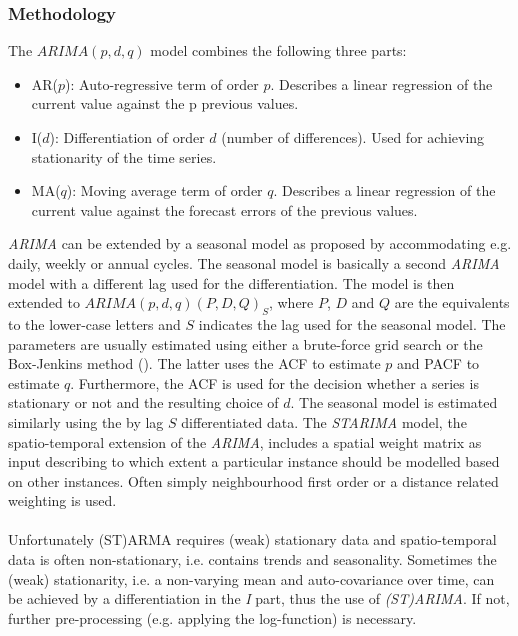 \documentclass[a4paper,reqno,]{article}
\begin{document}
\subsubsection{Methodology}
The $ARIMA(p,d,q)$ model combines the following three parts:
\begin{itemize}
\item AR($p$): Auto-regressive term of order $p$. Describes a linear regression of the current value against the p previous values.
\item I($d$): Differentiation of order $d$ (number of differences). Used for achieving stationarity of the time series.
\item MA($q$): Moving average term of order $q$. Describes a linear regression of the current value against the forecast errors of the previous values.
\end{itemize}
\textit{ARIMA} can be extended by a seasonal model as proposed by \cite{pfeifer1981seasonal} accommodating e.g. daily, weekly or annual cycles. The seasonal model is basically a second \textit{ARIMA} model with a different lag used for the differentiation. The model is then extended to $ARIMA(p,d,q)(P,D,Q)_S$, where $P$, $D$ and $Q$ are the equivalents to the lower-case letters and $S$ indicates the lag used for the seasonal model. The parameters are usually estimated using either a brute-force grid search or the Box-Jenkins method (\cite{BoxGeorgeE.P1970TSAF}). The latter uses the ACF to estimate $p$ and PACF to estimate $q$. Furthermore, the ACF is used for the decision whether a series is stationary or not and the resulting choice of $d$. The seasonal model is estimated similarly using the by lag $S$ differentiated data. The \textit{STARIMA} model, the spatio-temporal extension of the \textit{ARIMA}, includes a spatial weight matrix  as input describing to which extent a particular instance should be modelled based on other instances. Often simply neighbourhood first order or a distance related weighting is used.
\\
\\
Unfortunately (ST)ARMA requires (weak) stationary data and spatio-temporal data is often non-stationary, i.e. contains trends and seasonality. Sometimes the (weak) stationarity, i.e. a non-varying mean and auto-covariance over time, can be achieved by a differentiation in the \textit{I} part, thus the use of \textit{(ST)ARIMA}. If not, further pre-processing (e.g. applying the log-function) is necessary.
\end{document}
